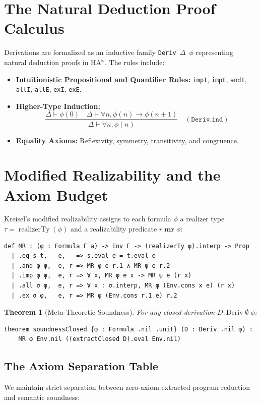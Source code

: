 \documentclass[11pt,a4paper]{article}
\newtheorem{theorem}{Theorem}[section]
\theoremstyle{definition}
\theoremstyle{remark}
\newcommand{\HAomega}{\ensuremath{\mathrm{HA}^\omega}}
\newcommand{\mr}{\ensuremath{\;\mathbf{mr}\;}}
\newcommand{\Deriv}{\ensuremath{\mathrm{Deriv}}}
\begin{document}
\section{The Natural Deduction Proof Calculus}

Derivations are formalized as an inductive family \texttt{Deriv $\Delta$ $\phi$} representing natural deduction proofs in $\HAomega$. The rules include:
\begin{itemize}
    \item \textbf{Intuitionistic Propositional and Quantifier Rules:} \texttt{impI}, \texttt{impE}, \texttt{andI}, \texttt{allI}, \texttt{allE}, \texttt{exI}, \texttt{exE}.
    \item \textbf{Higher-Type Induction:}
    \[
    \frac{\Delta \vdash \phi(0) \quad \Delta \vdash \forall n, \phi(n) \to \phi(n+1)}{\Delta \vdash \forall n, \phi(n)} \quad (\texttt{Deriv.ind})
    \]
    \item \textbf{Equality Axioms:} Reflexivity, symmetry, transitivity, and congruence.
\end{itemize}

\section{Modified Realizability and the Axiom Budget}

Kreisel's modified realizability assigns to each formula $\phi$ a realizer type $\tau = \operatorname{realizerTy}(\phi)$ and a realizability predicate $r \mr \phi$:
\begin{lstlisting}[language=Lean]
def MR : (φ : Formula Γ a) -> Env Γ -> (realizerTy φ).interp -> Prop
  | .eq s t,   e, _ => s.eval e = t.eval e
  | .and φ ψ,  e, r => MR φ e r.1 ∧ MR ψ e r.2
  | .imp φ ψ,  e, r => ∀ x, MR φ e x -> MR ψ e (r x)
  | .all σ φ,  e, r => ∀ x : σ.interp, MR φ (Env.cons x e) (r x)
  | .ex σ φ,   e, r => MR φ (Env.cons r.1 e) r.2
\end{lstlisting}

\begin{theorem}[Meta-Theoretic Soundness]
For any closed derivation $D : \Deriv \; \emptyset \; \phi$:
\begin{lstlisting}[language=Lean]
theorem soundnessClosed {φ : Formula .nil .unit} (D : Deriv .nil φ) :
    MR φ Env.nil ((extractClosed D).eval Env.nil)
\end{lstlisting}
\end{theorem}

\subsection{The Axiom Separation Table}
We maintain strict separation between zero-axiom extracted program reduction and semantic soundness:
\end{document}

